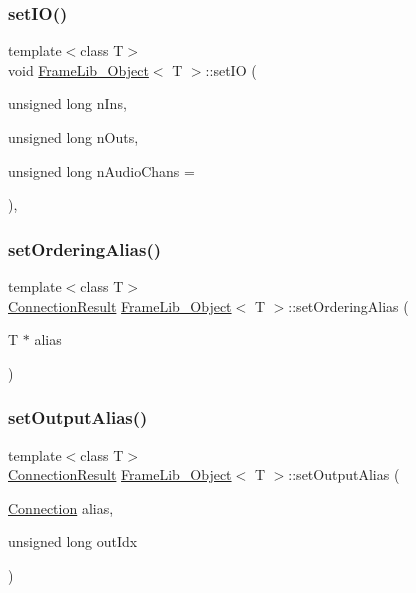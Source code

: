\subsubsection{\texorpdfstring{set\+I\+O()}{setIO()}}
{\footnotesize\ttfamily template$<$class T$>$ \\
void \hyperlink{class_frame_lib___object}{Frame\+Lib\+\_\+\+Object}$<$ T $>$\+::set\+IO (\begin{DoxyParamCaption}\item[{unsigned long}]{n\+Ins,  }\item[{unsigned long}]{n\+Outs,  }\item[{unsigned long}]{n\+Audio\+Chans = {} }\end{DoxyParamCaption})\hspace{0.3cm}{\ttfamily [inline]}, {\ttfamily [protected]}}

\mbox{\label{class_frame_lib___object_a8455782f3ba8037eb07b0d08ca6c59c2}} 
\subsubsection{\texorpdfstring{set\+Ordering\+Alias()}{setOrderingAlias()}}
{\footnotesize\ttfamily template$<$class T$>$ \\
\hyperlink{_frame_lib___types_8h_a2a427ca8c6f961bac8e41f6edecf0722}{Connection\+Result} \hyperlink{class_frame_lib___object}{Frame\+Lib\+\_\+\+Object}$<$ T $>$\+::set\+Ordering\+Alias (\begin{DoxyParamCaption}\item[{T $\ast$}]{alias }\end{DoxyParamCaption})\hspace{0.3cm}{\ttfamily [inline]}}

\mbox{\label{class_frame_lib___object_a689936615ffd3902f29eec957703f83c}} 
\subsubsection{\texorpdfstring{set\+Output\+Alias()}{setOutputAlias()}}
{\footnotesize\ttfamily template$<$class T$>$ \\
\hyperlink{_frame_lib___types_8h_a2a427ca8c6f961bac8e41f6edecf0722}{Connection\+Result} \hyperlink{class_frame_lib___object}{Frame\+Lib\+\_\+\+Object}$<$ T $>$\+::set\+Output\+Alias (\begin{DoxyParamCaption}\item[{\hyperlink{struct_frame_lib___object_1_1_connection}{Connection}}]{alias,  }\item[{unsigned long}]{out\+Idx }\end{DoxyParamCaption})\hspace{0.3cm}{\ttfamily [inline]}}

